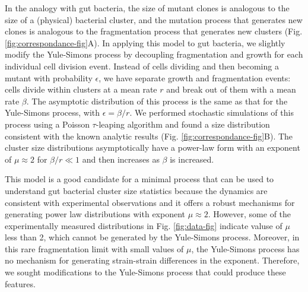 \documentclass[aps,pre,twocolumn]{revtex4-1}
\begin{document}
In the analogy with gut bacteria, the size of mutant clones is analogous to the size of a (physical) bacterial cluster, and the mutation process that generates new clones is analogous to the fragmentation process that generates new clusters (Fig. \ref{fig:correspondance-fig}A). In applying this model to gut bacteria, we slightly modify the Yule-Simons process by decoupling fragmentation and growth for each individual cell division event. Instead of cells dividing and then becoming a mutant with probability $\epsilon$, we have separate growth and fragmentation events: cells divide within clusters at a mean rate $r$ and break out of them with a mean rate $\beta$. The asymptotic distribution of this process is the same as that for the Yule-Simons process, with $\epsilon = \beta/r$. We performed stochastic simulations of this process using a Poisson $\tau$-leaping algorithm and found a size distribution consistent with the known analytic results (Fig. \ref{fig:correspondance-fig}B). The cluster size distributions asymptotically have a power-law form with an exponent of $\mu \approx 2$ for $\beta/r \ll 1$ and then increases as $\beta$ is increased. 

This model is a good candidate for a minimal process that can be used to understand gut bacterial cluster size statistics because the dynamics are consistent with experimental observations and it offers a robust mechanisms for generating power law distributions with exponent $\mu \approx 2$. However, some of the experimentally measured distributions in Fig. \ref{fig:data-fig} indicate valuse of $\mu$ less than 2, which cannot be generated by the Yule-Simons process. Moreover, in this rare fragmentation limit with small values of $\mu$, the Yule-Simons process has no mechanism for generating strain-strain differences in the exponent. Therefore, we sought modifications to the Yule-Simons process that could produce these features.%
 
\end{document}
